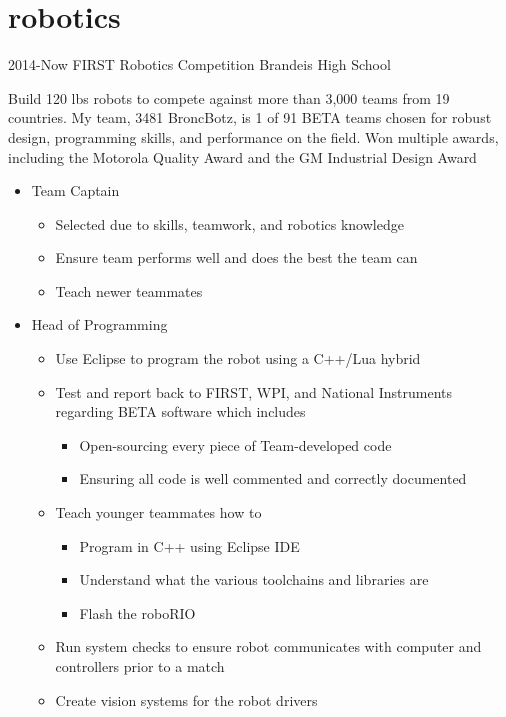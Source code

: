 \documentclass[]{friggeri-cv} %
\begin{document}
\section{robotics}

\begin{entrylist}


\entry
{2014-Now}
{FIRST Robotics Competition}
{Brandeis High School}
{Build 120 lbs robots to compete against more than 3,000 teams from 19 countries. My team, 3481 BroncBotz, is 1 of 91 BETA teams chosen for robust design, programming skills, and performance on the field. Won multiple awards, including the Motorola Quality Award and the GM Industrial Design Award 
\begin{itemize} 
\item Team Captain 
\begin{itemize} 
	\item Selected due to skills, teamwork, and robotics knowledge 
	\item Ensure team performs well and does the best the team can
	\item Teach newer teammates 
\end{itemize} 
\item Head of Programming 
\begin{itemize}
\item Use Eclipse to program the robot using a C++/Lua hybrid 
\item Test and report back to FIRST, WPI, and National Instruments regarding BETA software which includes 
\begin{itemize}
\item Open-sourcing every piece of Team-developed code 
\item Ensuring all code is well commented and correctly documented 
\end{itemize} 
\item Teach younger teammates how to
\begin{itemize}
\item Program in C++ using Eclipse IDE
\item Understand what the various toolchains and libraries are 
\item Flash the roboRIO  
\end{itemize}
\item Run system checks to ensure robot communicates with computer and controllers prior to a match 
\item Create vision systems for the robot drivers 

\end{itemize}
\end{itemize}}
\end{entrylist}
\end{document}
